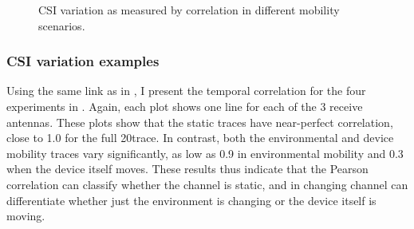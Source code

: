 \begin{figure}[htb]
	\hspace{0.06\textwidth}%
	\caption[CSI variation as measured by correlation in different mobility scenarios]{\label{fig:mobility_csi}CSI variation as measured by correlation in different mobility scenarios.}
\end{figure}

\subsubsection{CSI variation examples}
Using the same link as in , I present the temporal correlation for the four experiments in . Again, each plot shows one line for each of the 3 receive antennas. These plots show that the static traces have near-perfect correlation, close to 1.0 for the full 20\s trace.  In contrast, both the environmental and device mobility traces vary significantly, as low as 0.9 in environmental mobility and 0.3 when the device itself moves. These results thus indicate that the Pearson correlation can classify whether the channel is static, and in changing channel can differentiate whether just the environment is changing or the device itself is moving.

